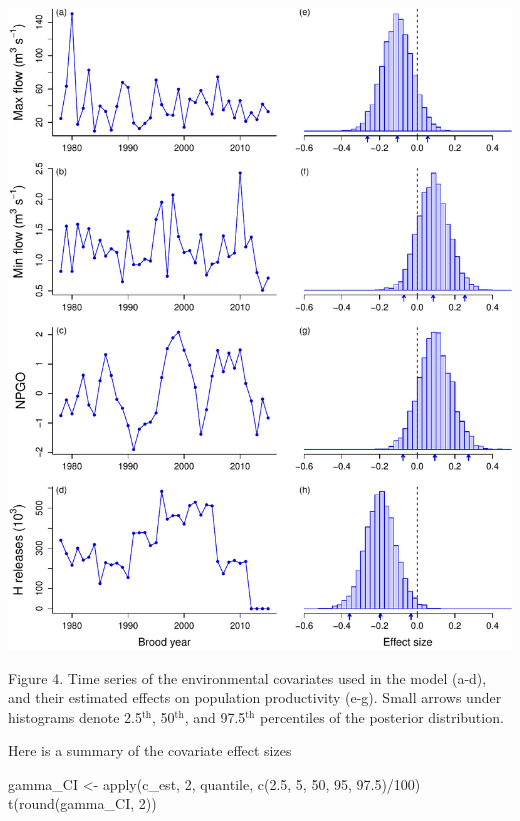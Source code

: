 \documentclass[11pt,]{article}
\newenvironment{Shaded}{}{}
\newcommand{\DecValTok}[1]{#1}
\newcommand{\FloatTok}[1]{#1}
\newcommand{\KeywordTok}[1]{\textcolor[rgb]{0.00,0.00,1.00}{#1}}
\newcommand{\NormalTok}[1]{#1}
\newcommand{\OperatorTok}[1]{#1}
\newcommand{\StringTok}[1]{\textcolor[rgb]{0.00,0.50,0.50}{#1}}
\begin{document}
\begin{center}\includegraphics{App_3_Summarize_results_files/figure-latex/fig_4_cov_effects-1} \end{center}

Figure 4. Time series of the environmental covariates used in the model
(a-d), and their estimated effects on population productivity (e-g).
Small arrows under histograms denote 2.5\(^\text{th}\),
50\(^\text{th}\), and 97.5\(^\text{th}\) percentiles of the posterior
distribution.

Here is a summary of the covariate effect sizes

\begin{Shaded}
\begin{Highlighting}[]
\NormalTok{gamma_CI <-}\StringTok{ }\KeywordTok{apply}\NormalTok{(c_est, }\DecValTok{2}\NormalTok{, quantile, }\KeywordTok{c}\NormalTok{(}\FloatTok{2.5}\NormalTok{, }\DecValTok{5}\NormalTok{, }\DecValTok{50}\NormalTok{, }\DecValTok{95}\NormalTok{, }\FloatTok{97.5}\NormalTok{)}\OperatorTok{/}\DecValTok{100}\NormalTok{)}
\KeywordTok{t}\NormalTok{(}\KeywordTok{round}\NormalTok{(gamma_CI, }\DecValTok{2}\NormalTok{))}
\end{Highlighting}
\end{Shaded}
\end{document}
